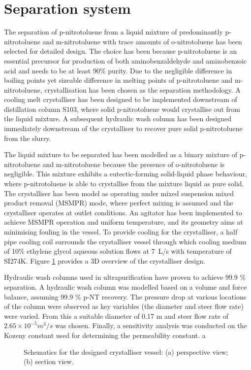 \section*{Separation system}

The separation of p-nitrotoluene from a liquid mixture of predominantly p-nitrotoluene and m-nitrotoluene with trace amounts of o-nitrotoluene has been selected for detailed design. The choice has been because p-nitrotoluene is an essential precursor for production of both aminobenzaldehyde and aminobenzoic acid and needs to be at least 90\% purity. Due to the negligible difference in boiling points yet sizeable difference in melting points of p-nitrotoluene and m-nitrotoluene, crystallisation has been chosen as the separation methodology. A cooling melt crystalliser has been designed to be implemented downstream of distillation column S103, where solid p-nitrotoluene would crystallise out from the liquid mixture. A subsequent hydraulic wash column has been designed immediately downstream of the crystalliser to recover pure solid p-nitrotoluene from the slurry. 


The liquid mixture to be separated has been modelled as a binary mixture of p-nitrotoluene and m-nitrotoluene because the presence of o-nitrotoluene is negligible. This mixture exhibits a eutectic-forming solid-liquid phase behaviour, where p-nitrotoluene is able to crystallise from the mixture liquid as pure solid. The crystalliser has been model as operating under mixed suspension mixed product removal (MSMPR) mode, where perfect mixing is assumed and the crystalliser operates at outlet conditions. An agitator has been implemented to achieve MSMPR operation and uniform temperature, and its geometry aims at minimising fouling in the vessel. To provide cooling for the crystalliser, a half pipe cooling coil surrounds the crystalliser vessel through which cooling medium of 10\% ethylene glycol aqueous solution flows at \SI{7}{L/s} with temperature of SI{274}{K}. Figure \ref{fig:crystalliser schematic executive} provides a 3D overview of the crystalliser design.


Hydraulic wash columns used in ultrapurification have proven to achieve 99.9 \% separation. A hydraulic wash column was modelled based on a volume and force balance, assuming 99.9 \% p-NT recovery. The pressure drop at various locations of the column were observed as key variables (the diameter and steer flow rate) were varied. From this a suitable diameter of 0.17 m and steer flow rate  of $2.65 \times 10^{-5} m^{3}/s$ was chosen. Finally, a sensitivity analysis was conducted on the Kozeny constant used for determining the permeability constant. 
 a
\begin{figure}[h]
    \centering
    
    \caption{Schematics for the designed crystalliser vessel: (a) perspective view; (b) section view.}
    \label{fig:crystalliser schematic executive}
\end{figure}


